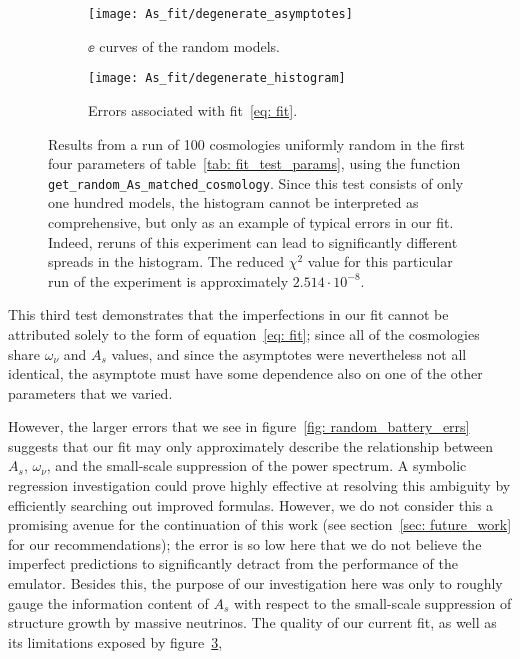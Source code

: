 \begin{figure}[ht!]
    \begin{subfigure}{0.45 \textwidth}
    \centering
 		\texttt{[image: As\_fit/degenerate\_asymptotes]}
 		\cprotect\caption{$\ee$ curves of the random models.}
 		\label{fig: degenerate_battery}
    \end{subfigure}
    \begin{subfigure}{0.45 \textwidth}
    \centering
 		\texttt{[image: As\_fit/degenerate\_histogram]}
 		\caption{Errors associated with fit~\ref{eq: fit}.}
 		\label{fig: degenerate_battery_errs}
    \end{subfigure}
        \centering
    \cprotect\caption[$A_s$-degenerate Fit Test]
    		{Results from a run of 100 cosmologies uniformly
    			random in the first four parameters of
    			table~\ref{tab: fit_test_params}, using the function
    			\verb|get_random_As_matched_cosmology|. 
    			Since this test consists of
    			only one hundred models, the histogram cannot be interpreted as
    			comprehensive, but only as an example of typical errors in our
    			fit. Indeed, reruns of this experiment can lead to
    			significantly different spreads in the histogram.
    			The reduced $\chi^2$ value for this particular run of the
    			experiment is approximately $2.514 \cdot 10^{-8}$.}
    \label{fig: degenerate_cosmology_experiment}
\end{figure}

This third test demonstrates that the imperfections in our fit cannot be
attributed solely to the form of equation~\ref{eq: fit};  
since all of the cosmologies share $\omega_\nu$ and $A_s$ values, and since
the asymptotes were nevertheless not all identical, the
asymptote must have some dependence also on one of the other parameters that
we varied.  

However, the larger errors that we see in
figure~\ref{fig: random_battery_errs} suggests that our fit may only
approximately describe the relationship
between $A_s$, $\omega_\nu$, and the small-scale suppression of the power
spectrum. A symbolic regression investigation could prove highly effective at
resolving this ambiguity by efficiently searching out improved formulas. 
However, we do not consider this a promising avenue
for the continuation of this work (see section~\ref{sec: future_work} for our
recommendations); the error
is so low here that we do not believe the imperfect predictions to
significantly detract from the performance of the emulator. Besides this,
the purpose of our investigation here was only to roughly gauge the 
information content of $A_s$ with respect to the small-scale suppression of 
structure growth by massive neutrinos. The quality of our current fit, as
well as its limitations exposed by
figure~\ref{fig: degenerate_cosmology_experiment}, 

